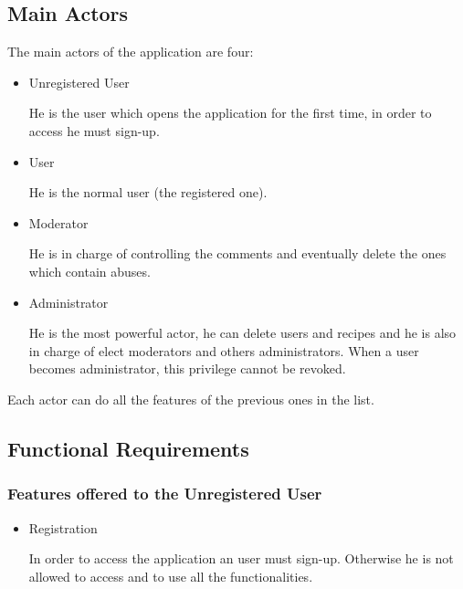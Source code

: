 \documentclass[a4paper]{report}
\begin{document}
\subsection{Main Actors}
The main actors of the application are four:
\begin{itemize}
	\item Unregistered User
	
	\noindent He is the user which opens the application for the first time, in order to access he must sign-up.
	
	\item User
	
	\noindent He is the normal user (the registered one).
	
	\item Moderator
	
	\noindent He is in charge of controlling the comments and eventually delete the ones which contain abuses.
	
	\item Administrator
	
	\noindent He is the most powerful actor, he can delete users and recipes and he is also in charge of elect moderators and others administrators. When a user becomes administrator, this privilege cannot be revoked.
\end{itemize}

\noindent Each actor can do all the features of the previous ones in the list.

\subsection{Functional Requirements}
\subsubsection{Features offered to the Unregistered User}
\begin{itemize}
	\item  Registration
	
	\noindent In order to access the application an user must sign-up. Otherwise he is not allowed to access and to use all the functionalities.
\end{itemize}
\end{document}
